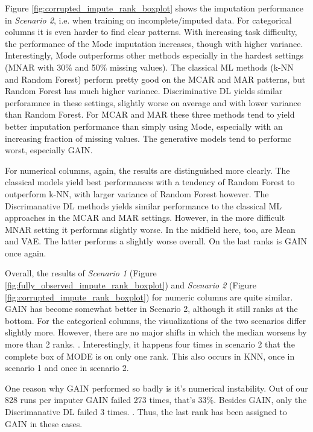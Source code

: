 Figure \ref{fig:corrupted_impute_rank_boxplot} shows the imputation performance in \textit{Scenario 2}, i.e. when training on incomplete/imputed data. For categorical columns it is even harder to find clear patterns. With increasing task difficulty, the performance of the Mode imputation increases, though with higher variance. Interestingly, Mode outperforms other methods especially in the hardest settings (MNAR with 30\% and 50\% missing values). The classical ML methods (k-NN and Random Forest) perform pretty good on the MCAR and MAR patterns, but Random Forest has much higher variance. Discriminative DL yields similar perforamnce in these settings, slightly worse on average and with lower variance than Random Forest. For MCAR and MAR these three methods tend to yield better imputation performance than simply using Mode, especially with an increasing fraction of missing values. The generative models tend to performc worst, especially GAIN.

For numerical columns, again, the results are distinguished more clearly. The classical models yield best performances with a tendency of Random Forest to outperform k-NN, with larger variance of Random Forest however. The Discrimanative DL methods yields similar performance to the classical ML approaches in the MCAR and MAR settings. However, in the more difficult MNAR setting it performns slightly worse. In the midfield here, too, are Mean and VAE. The latter performs a slightly worse overall. On the last ranks is GAIN once again.

Overall, the results of \textit{Scenario 1} (Figure \ref{fig:fully_observed_impute_rank_boxplot}) and \textit{Scenario 2} (Figure \ref{fig:corrupted_impute_rank_boxplot}) for numeric columns are quite similar. GAIN has become somewhat better in Scenario 2, although it still ranks at the bottom. For the categorical columns, the visualizations of the two scenarios differ slightly more. However, there are no major shifts in which the median worsens by more than 2 ranks. . Interestingly, it happens four times in scenario 2 that the complete box of MODE is on only one rank. This also occurs in KNN, once in scenario 1 and once in scenario 2.

One reason why GAIN performed so badly is it's numerical instability. Out of our 828 runs per imputer GAIN failed 273 times, that's 33\%. Besides GAIN, only the Discrimanative DL failed 3 times. . Thus, the last rank has been assigned to GAIN in these cases.


